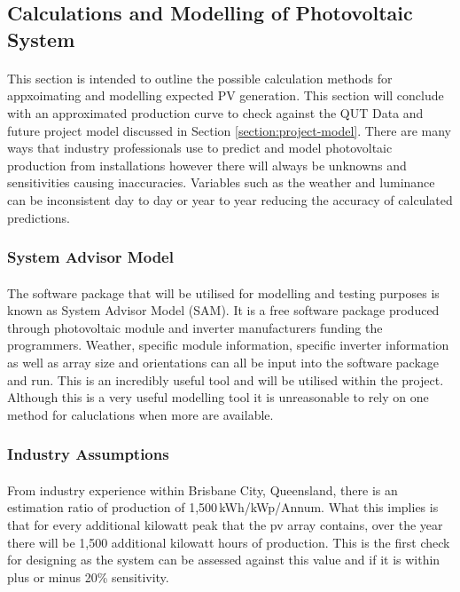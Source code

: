 
\subsection{Calculations and Modelling of Photovoltaic System} \label{section:PV-Calculations}

\paragraph{}
This section is intended to outline the possible calculation methods for appxoimating and modelling expected PV generation. This section will conclude with an approximated production curve to check against the QUT Data and future project model discussed in Section \ref{section:project-model}. There are many ways that industry professionals use to predict and model photovoltaic production from installations however there will always be unknowns and sensitivities causing inaccuracies. Variables such as the weather and luminance can be inconsistent day to day or year to year reducing the accuracy of calculated predictions.

\subsubsection{System Advisor Model}

\paragraph{}
The software package that will be utilised for modelling and testing purposes is known as System Advisor Model (SAM). It is a free software package produced through photovoltaic module and inverter manufacturers funding the programmers. Weather, specific module information, specific inverter information as well as array size and orientations can all be input into the software package and run. This is an incredibly useful tool and will be utilised within the project. Although this is a very useful modelling tool it is unreasonable to rely on one method for caluclations when more are available. 

\subsubsection{Industry Assumptions}

\paragraph{}
From industry experience within Brisbane City, Queensland, there is an estimation ratio of production of 1,500\,kWh/kWp/Annum. What this implies is that for every additional kilowatt peak that the pv array contains, over the year there will be 1,500 additional kilowatt hours of production. This is the first check for designing as the system can be assessed against this value and if it is within plus or minus 20\% sensitivity.      
    